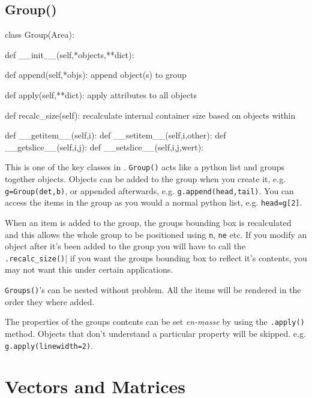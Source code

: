 \documentclass[a4paper]{book}
\begin{document}
\subsection{Group()}
\label{sec:group}
\begin{python}
class Group(Area):

    def __init__(self,*objects,**dict):

    def append(self,*objs):
        append object(s) to group

    def apply(self,**dict):
        apply attributes to all objects

    def recalc_size(self):
        recalculate internal container size based on objects within

    def __getitem__(self,i):
    def __setitem__(self,i,other):
    def __getslice__(self,i,j):
    def __setslice__(self,i,j,wert):
\end{python}

This is one of the key classes in \pyscript. \Verb|Group()| acts
like a python list and groups together  \pyscript objects. Objects
can be added to the group when you create it, e.g. \Verb|g=Group(det,b)|,
or appended afterwards, e.g. \Verb|g.append(head,tail)|. You can access the 
items in the group as you would a normal python list, e.g. \Verb|head=g[2]|.

When an item is added to the group, the groups bounding box is recalculated
and this allows the whole group to be positioned using \Verb|n|, \Verb|ne|
etc. If you modify an object after it's been added to the group you will
have to call the \Verb|.recalc_size()|| if you want the groups bounding box
to reflect it's contents, you may not want this under certain applications. 

\Verb|Groups()|'s can be nested without problem. All the items will be
rendered in the order they where added. 

The properties of the groups contents can be set \emph{en-masse} by
using the \Verb|.apply()| method. Objects that don't understand a
particular property will be skipped. e.g. \Verb|g.apply(linewidth=2)|.



\section{Vectors and Matrices}

\end{document}
